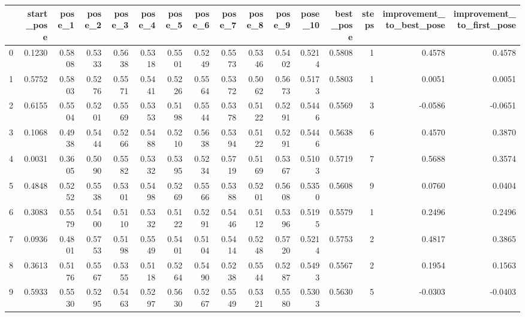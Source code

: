 \begin{tabular}{lrrrrrrrrrrrrrrr}
\toprule
{} &  start\_pose &  pose\_1 &  pose\_2 &  pose\_3 &  pose\_4 &  pose\_5 &  pose\_6 &  pose\_7 &  pose\_8 &  pose\_9 &  pose\_10 &  best\_pose &  steps &  improvement\_to\_best\_pose &  improvement\_to\_first\_pose \\
\midrule
0   &      0.1230 &  0.5808 &  0.5333 &  0.5638 &  0.5318 &  0.5501 &  0.5249 &  0.5573 &  0.5346 &  0.5402 &   0.5214 &     0.5808 &      1 &                    0.4578 &                     0.4578 \\
1   &      0.5752 &  0.5803 &  0.5276 &  0.5571 &  0.5441 &  0.5226 &  0.5564 &  0.5372 &  0.5062 &  0.5673 &   0.5173 &     0.5803 &      1 &                    0.0051 &                     0.0051 \\
2   &      0.6155 &  0.5504 &  0.5201 &  0.5569 &  0.5353 &  0.5198 &  0.5544 &  0.5378 &  0.5122 &  0.5291 &   0.5446 &     0.5569 &      3 &                   -0.0586 &                    -0.0651 \\
3   &      0.1068 &  0.4938 &  0.5444 &  0.5266 &  0.5488 &  0.5210 &  0.5638 &  0.5394 &  0.5122 &  0.5291 &   0.5446 &     0.5638 &      6 &                    0.4570 &                     0.3870 \\
4   &      0.0031 &  0.3605 &  0.5090 &  0.5582 &  0.5332 &  0.5395 &  0.5234 &  0.5719 &  0.5169 &  0.5367 &   0.5103 &     0.5719 &      7 &                    0.5688 &                     0.3574 \\
5   &      0.4848 &  0.5252 &  0.5538 &  0.5301 &  0.5498 &  0.5269 &  0.5566 &  0.5388 &  0.5201 &  0.5608 &   0.5350 &     0.5608 &      9 &                    0.0760 &                     0.0404 \\
6   &      0.3083 &  0.5579 &  0.5400 &  0.5110 &  0.5332 &  0.5122 &  0.5291 &  0.5446 &  0.5112 &  0.5396 &   0.5195 &     0.5579 &      1 &                    0.2496 &                     0.2496 \\
7   &      0.0936 &  0.4801 &  0.5753 &  0.5198 &  0.5549 &  0.5401 &  0.5104 &  0.5414 &  0.5248 &  0.5720 &   0.5214 &     0.5753 &      2 &                    0.4817 &                     0.3865 \\
8   &      0.3613 &  0.5176 &  0.5567 &  0.5355 &  0.5118 &  0.5264 &  0.5490 &  0.5238 &  0.5544 &  0.5287 &   0.5493 &     0.5567 &      2 &                    0.1954 &                     0.1563 \\
9   &      0.5933 &  0.5530 &  0.5295 &  0.5463 &  0.5297 &  0.5630 &  0.5267 &  0.5549 &  0.5321 &  0.5580 &   0.5303 &     0.5630 &      5 &                   -0.0303 &                    -0.0403 \\

\end{tabular}
